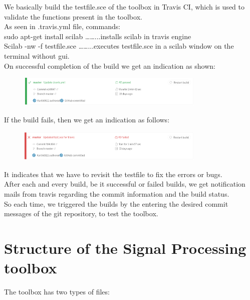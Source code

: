 \documentclass[12pt,a4paper]{report}
\begin{document}
We basically build the testfile.sce of the toolbox in Travis CI, which is used to validate the functions present in the toolbox. \\
As seen in .travis.yml file, commands:\\
    sudo apt-get install scilab      ……...installs scilab in travis engine\\
    Scilab -nw -f testfile.sce         ……...executes testfile.sce in a scilab window on the terminal without gui.\\

On successful completion of the build we get an indication as shown:\\
\begin{figure}[H]
\centering
\includegraphics[width = 0.8\textwidth]{travissuccess.png}
\end{figure}

\newpage
If the build fails, then we get an indication as follows:\\
\begin{figure}[H]
\centering
\includegraphics[width = 0.8\textwidth]{travisfail.png}
\end{figure}
It indicates that we have to revisit the testfile to fix the errors or bugs.\\
After each and every build, be it successful or failed builds, we get notification mails from travis regarding the commit information and the build status.\\
So each time, we triggered the builds by the entering the desired commit messages of the git repository, to test the toolbox.

\newpage













\chapter{\textbf{Structure of the Signal Processing toolbox}}
The toolbox has two types of files:
\end{document}
